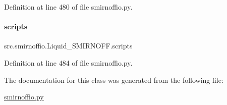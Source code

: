 Definition at line 480 of file smirnoffio.\+py.

\mbox{\label{classsrc_1_1smirnoffio_1_1Liquid__SMIRNOFF_ad6ceb0f48940085a40cfffac1989b5ea}} 
\paragraph{\texorpdfstring{scripts}{scripts}}
{\footnotesize\ttfamily src.\+smirnoffio.\+Liquid\+\_\+\+S\+M\+I\+R\+N\+O\+F\+F.\+scripts}



Definition at line 484 of file smirnoffio.\+py.



The documentation for this class was generated from the following file\+:\begin{DoxyCompactItemize}
\item 
\hyperlink{smirnoffio_8py}{smirnoffio.\+py}\end{DoxyCompactItemize}

